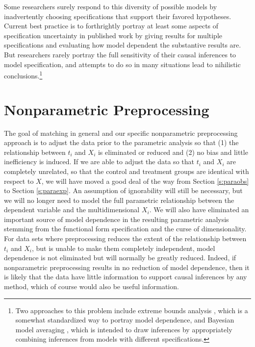 \documentclass[11pt,titlepage]{article}
\begin{document}

Some researchers surely respond to this diversity of possible models
by inadvertently choosing specifications that support their favored
hypotheses.  Current best practice is to forthrightly portray at least
some aspects of specification uncertainty in published work by giving
results for multiple specifications and evaluating how model dependent
the substantive results are.  But researchers rarely portray the full
sensitivity of their causal inferences to model specification, and
attempts to do so in many situations lead to nihilistic
conclusions.\footnote{Two approaches to this problem include extreme
  bounds analysis \citep{Leamer78}, which is a somewhat standardized
  way to portray model dependence, and Bayesian model averaging
  \citep{HoeMadRaf99,ImaKin04}, which is intended to draw inferences
  by appropriately combining inferences from models with different
  specifications.}

\section{Nonparametric Preprocessing} \label{s:nonparpreproc}

The goal of matching in general and our specific nonparametric
preprocessing approach is to adjust the data prior to the parametric
analysis so that (1) the relationship between $t_i$ and $X_i$ is
eliminated or reduced and (2) no bias and little inefficiency is
induced.  If we are able to adjust the data so that $t_i$ and $X_i$
are completely unrelated, so that the control and treatment groups are
identical with respect to $X$, we will have moved a good deal of the
way from Section \ref{s:paraobs} to Section \ref{s:paraexp}.  An
assumption of ignorability will still be necessary, but we will no
longer need to model the full parametric relationship between the
dependent variable and the multidimensional $X_i$.  We will also have
eliminated an important source of model dependence in the resulting
parametric analysis stemming from the functional form specification
and the curse of dimensionality.  For data sets where preprocessing
reduces the extent of the relationship between $t_i$ and $X_i$, but is
unable to make them completely independent, model dependence is not
eliminated but will normally be greatly reduced.  Indeed, if
nonparametric preprocessing results in no reduction of model
dependence, then it is likely that the data have little information to
support causal inferences by any method, which of course would also be
useful information.
\end{document}
